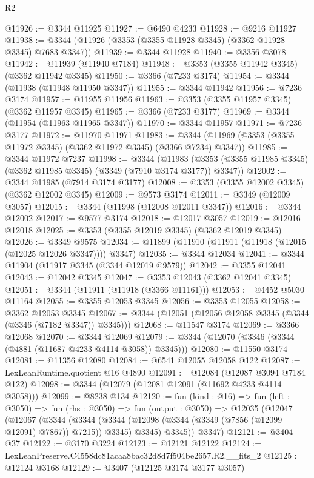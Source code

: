 \begin{lexlean}{R2}
\begin{coremodule}
@11926 := @3344 @11925
@11927 := @6490 @4233
@11928 := @9216 @11927
@11938 := @3344 (@11926 (@3353 (@3355 @11928 @3345) (@3362 @11928 @3345) @7683 @3347))
@11939 := @3344 @11928
@11940 := @3356 @3078
@11942 := @11939 (@11940 @7184)
@11948 := @3353 (@3355 @11942 @3345) (@3362 @11942 @3345)
@11950 := @3366 (@7233 @3174)
@11954 := @3344 (@11938 (@11948 @11950 @3347))
@11955 := @3344 @11942
@11956 := @7236 @3174
@11957 := @11955 @11956
@11963 := @3353 (@3355 @11957 @3345) (@3362 @11957 @3345)
@11965 := @3366 (@7233 @3177)
@11969 := @3344 (@11954 (@11963 @11965 @3347))
@11970 := @3344 @11957
@11971 := @7236 @3177
@11972 := @11970 @11971
@11983 := @3344 (@11969 (@3353 (@3355 @11972 @3345) (@3362 @11972 @3345) (@3366 @7234) @3347))
@11985 := @3344 @11972 @7237
@11998 := @3344
    (@11983 (@3353 (@3355 @11985 @3345) (@3362 @11985 @3345) (@3349 (@7910 @3174 @3177)) @3347))
@12002 := @3344 @11985 (@7914 @3174 @3177)
@12008 := @3353 (@3355 @12002 @3345) (@3362 @12002 @3345)
@12009 := @9573 @3174
@12011 := @3349 (@12009 @3057)
@12015 := @3344 (@11998 (@12008 @12011 @3347))
@12016 := @3344 @12002
@12017 := @9577 @3174
@12018 := @12017 @3057
@12019 := @12016 @12018
@12025 := @3353 (@3355 @12019 @3345) (@3362 @12019 @3345)
@12026 := @3349 @9575
@12034 := @11899 (@11910 (@11911 (@11918 (@12015 (@12025 @12026 @3347)))) @3347)
@12035 := @3344 @12034
@12041 := @3344 @11904 (@11917 @3345 (@3344 @12019 @9579))
@12042 := @3355 @12041
@12043 := @12042 @3345
@12047 := @3353 @12043 (@3362 @12041 @3345)
@12051 := @3344 (@11911 (@11918 (@3366 @11161)))
@12053 := @4452 @5030 @11164
@12055 := @3355 @12053 @3345
@12056 := @3353 @12055
@12058 := @3362 @12053 @3345
@12067 := @3344 (@12051 (@12056 @12058 @3345 (@3344 (@3346 (@7182 @3347)) @3345)))
@12068 := @11547 @3174
@12069 := @3366 @12068
@12070 := @3344 @12069
@12079 := @3344 (@12070 (@3346 (@3344 (@4881 (@11687 @4233 @4114 @3058)) @3345)))
@12080 := @11550 @3174
@12081 := @11356 @12080
@12084 := @6541 @12055 @12058 @122
@12087 := LexLeanRuntime.quotient @16 @4890
@12091 := @12084 (@12087 @3094 @7184 @122)
@12098 := @3344 (@12079 (@12081 @12091 (@11692 @4233 @4114 @3058)))
@12099 := @8238 @134
@12120 := fun (kind : @16) =>
  fun (left : @3050) =>
  fun (rhs : @3050) =>
  fun (output : @3050) =>
  @12035
    (@12047
      (@12067
        (@3344
          (@3344 (@3344 (@12098 (@3344 (@3349 (@7856 (@12099 @12091) @7867)) @7215)) @3345) @3345)
          @3345))
      @3347)
@12121 := @3404 @37
@12122 := @3170 @3224
@12123 := @12121 @12122
@12124 := LexLeanPreserve.C4558dc81acaa8bac32d8d7f504be2657.R2.__fits_2
@12125 := @12124 @3168
@12129 := @3407 (@12125 @3174 @3177 @3057)

\end{coremodule}
\end{lexlean}
